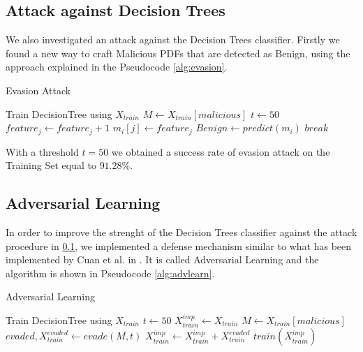 \documentclass[twocolumn, switch]{article} %
\begin{document}
\subsection{Attack against Decision Trees}
\label{subsec:tree}
We also investigated an attack against the Decision Trees classifier. Firstly we found a new way to craft Malicious PDFs that are detected as Benign, using the approach explained in the Pseudocode \ref{alg:evasion}.
\begin{algorithm}
	{\footnotesize
		\caption{Evasion Attack}\label{alg:evasion}
		\begin{algorithmic}
			\Require Train DecisionTree using $X_{train}$
			\State $M \gets X_{train}[malicious]$
			\State $t \gets 50$
			\State $feature_j \gets feature_j + 1$
			\State $m_i[j] \gets feature_j$
			\State $Benign \gets predict(m_i)$
			\State $break$  
			\EndIf
			\EndWhile
			\EndFor
			\EndFor
		\end{algorithmic}
	}
\end{algorithm}

With a threshold $t=50$ we obtained a success rate of evasion attack on the Training Set equal to $91.28\%$.

\subsection{Adversarial Learning}
In order to improve the strenght of the Decision Trees classifier against the attack procedure in \ref{subsec:tree}, we implemented a defense mechanism similar to what has been implemented by Cuan et al. in \cite{cuan_damien_delaplace_valois_2018}.
It is called Adversarial Learning and the algorithm is shown in Pseudocode \ref{alg:advlearn}.

\begin{algorithm}
	{\footnotesize
		\caption{Adversarial Learning}\label{alg:advlearn}
		\begin{algorithmic}
			\Require Train DecisionTree using $X_{train}$
			\State $t \gets 50$
			\State $X_{train}^{imp} \gets X_{train}$
			\State $M \gets X_{train}[malicious]$
			\While{$\#PDF evaded > 0$}
			\State $evaded,X_{train}^{evaded} \gets evade(M,t)$
			\If{$evaded$ is $True$}
			\State $X_{train}^{imp} \gets X_{train}^{imp} + X_{train}^{evaded}$
			\EndIf
			\State $train(X_{train}^{imp})$
			\EndWhile
		\end{algorithmic}
	}
\end{algorithm}
\end{document}
